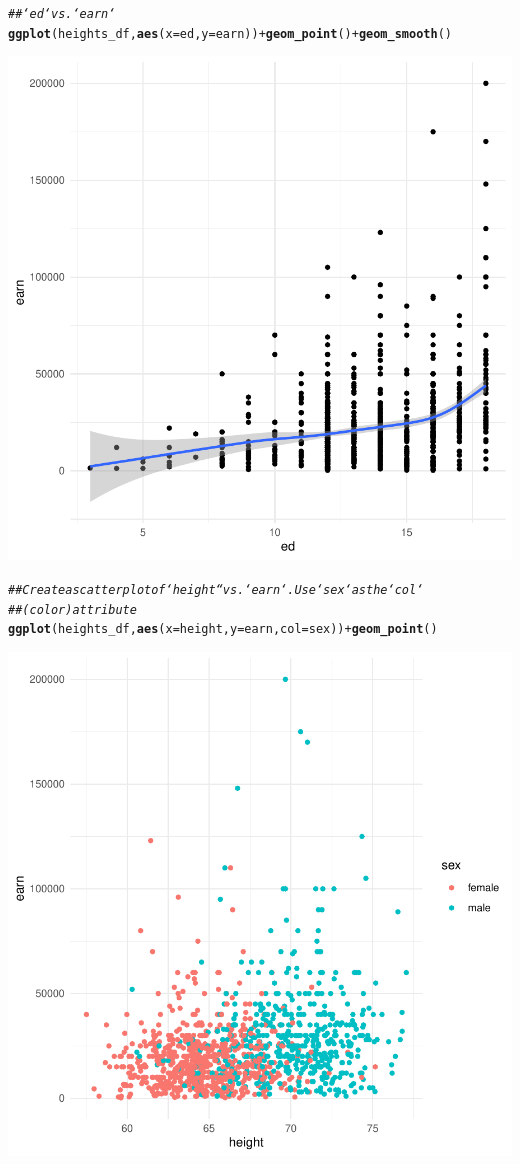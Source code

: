 \documentclass{article}\usepackage[]{graphicx}\usepackage[]{xcolor}
\makeatletter
\newcommand{\hlcom}[1]{\textcolor[rgb]{0.678,0.584,0.686}{\textit{#1}}}%
\newcommand{\hlopt}[1]{\textcolor[rgb]{0,0,0}{#1}}%
\newcommand{\hlstd}[1]{\textcolor[rgb]{0.345,0.345,0.345}{#1}}%
\newcommand{\hlkwc}[1]{\textcolor[rgb]{0.333,0.667,0.333}{#1}}%
\newcommand{\hlkwd}[1]{\textcolor[rgb]{0.737,0.353,0.396}{\textbf{#1}}}%
\newenvironment{kframe}{%
 \def\at@end@of@kframe{}%
 \ifinner\ifhmode%
  \def\at@end@of@kframe{\end{minipage}}%
  \begin{minipage}{\columnwidth}%
 \fi\fi%
 \def\FrameCommand##1{\hskip\@totalleftmargin \hskip-\fboxsep
 \colorbox{shadecolor}{##1}\hskip-\fboxsep
     \hskip-\linewidth \hskip-\@totalleftmargin \hskip\columnwidth}%
 \MakeFramed {\advance\hsize-\width
   \@totalleftmargin\z@ \linewidth\hsize
   \@setminipage}}%
 {\par\unskip\endMakeFramed%
 \at@end@of@kframe}
\newenvironment{knitrout}{}{} %
\makeatother
\begin{document}
\begin{knitrout}
{}


\begin{kframe}\begin{alltt}
\hlcom{## `ed` vs. `earn`}
\hlkwd{ggplot}\hlstd{(heights_df,} \hlkwd{aes}\hlstd{(}\hlkwc{x}\hlstd{=ed,} \hlkwc{y}\hlstd{=earn))} \hlopt{+} \hlkwd{geom_point}\hlstd{()} \hlopt{+} \hlkwd{geom_smooth}\hlstd{()}
\end{alltt}


{\ttfamily\noindent\itshape{}}\end{kframe}

{\centering \includegraphics[width=.6\linewidth]{figure/assignment-03-Reppeto-Brian-Rnwauto-report-6} 

}


\begin{kframe}\begin{alltt}
\hlcom{## Create a scatterplot of `height`` vs. `earn`.  Use `sex` as the `col` }
\hlcom{##(color) attribute}
\hlkwd{ggplot}\hlstd{(heights_df,} \hlkwd{aes}\hlstd{(}\hlkwc{x}\hlstd{=height,} \hlkwc{y}\hlstd{=earn,} \hlkwc{col}\hlstd{=sex))} \hlopt{+} \hlkwd{geom_point}\hlstd{()}
\end{alltt}
\end{kframe}

{\centering \includegraphics[width=.6\linewidth]{figure/assignment-03-Reppeto-Brian-Rnwauto-report-7} 

}
\end{knitrout}
\end{document}
